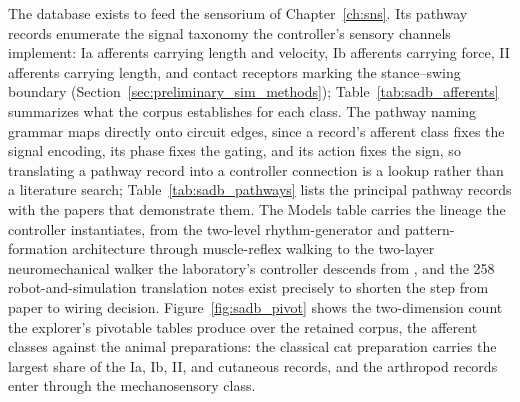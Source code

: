The database exists to feed the sensorium of Chapter~\ref{ch:sns}. Its pathway records enumerate the signal taxonomy the controller's sensory channels implement: Ia afferents carrying length and velocity, Ib afferents carrying force, II afferents carrying length, and contact receptors marking the stance--swing boundary (Section~\ref{sec:preliminary_sim_methods}); Table~\ref{tab:sadb_afferents} summarizes what the corpus establishes for each class. The pathway naming grammar maps directly onto circuit edges, since a record's afferent class fixes the signal encoding, its phase fixes the gating, and its action fixes the sign, so translating a pathway record into a controller connection is a lookup rather than a literature search; Table~\ref{tab:sadb_pathways} lists the principal pathway records with the papers that demonstrate them. The Models table carries the lineage the controller instantiates, from the two-level rhythm-generator and pattern-formation architecture \citep{rybak_modelling_2006} through muscle-reflex walking \citep{geyer_musclereflex_2010} to the two-layer neuromechanical walker the laboratory's controller descends from \citep{deng_neuromechanical_2019}, and the 258 robot-and-simulation translation notes exist precisely to shorten the step from paper to wiring decision. Figure~\ref{fig:sadb_pivot} shows the two-dimension count the explorer's pivotable tables produce over the retained corpus, the afferent classes against the animal preparations: the classical cat preparation carries the largest share of the Ia, Ib, II, and cutaneous records, and the arthropod records enter through the mechanosensory class.

